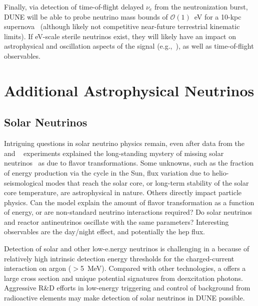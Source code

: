 Finally, via detection of time-of-flight delayed $\nu_e$ from the  neutronization burst,  DUNE will be able to probe neutrino mass bounds of $\mathcal{O}(1)$~eV for a 10-kpc supernova~\cite{Rossi-Torres:2015rla} (although likely not competitive near-future terrestrial kinematic limits).  If eV-scale sterile neutrinos exist, they will likely have an impact on astrophysical and oscillation aspects of the signal (e.g.,~\cite{Keranen:2007ga,Tamborra:2011is,Esmaili:2014gya}), as well as time-of-flight observables. \\





\section{Additional Astrophysical Neutrinos}
\label{sec:physics-snblowe-other}

\subsection{Solar Neutrinos}

Intriguing questions in solar neutrino physics remain,
even after data
from the  and ~\cite{Fukuda:2001nj,Ahmad:2001an}
experiments explained the long-standing mystery of missing solar
neutrinos~\cite{Cleveland:1998nv} as due to flavor
transformations. 
Some unknowns, such as the fraction of energy production via the 
cycle in the Sun, flux variation due to helio-seismological modes that
reach the solar core, or long-term stability of the solar core
temperature, are astrophysical in nature. Others directly impact
particle physics. Can the  model explain the amount of flavor
transformation as a function of energy, or are non-standard neutrino
interactions required?  Do solar neutrinos and reactor antineutrinos
oscillate with the same parameters?   Interesting observables are the
day/night effect, and potentially the hep flux.

Detection of solar and other low-e.nergy neutrinos is challenging in
a  because of relatively high intrinsic detection energy thresholds for
the charged-current interaction on argon ($>$\SI{5}{\MeV}). 
Compared with other technologies, a  offers a large
cross section and unique potential signatures from deexcitation
photons. Aggressive R\&D efforts in low-energy triggering and
control of background from radioactive elements may make detection
of solar neutrinos in DUNE possible.

